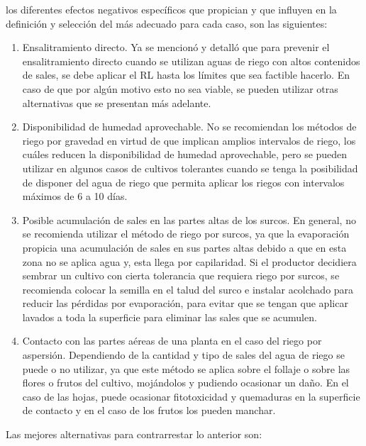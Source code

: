los diferentes efectos negativos específicos que propician y que influyen en la definición y selección del más adecuado para cada caso, son las siguientes:
\begin{enumerate}
    \item Ensalitramiento directo. Ya se mencionó y detalló que para prevenir el ensalitramiento directo cuando se utilizan aguas de riego con altos contenidos de sales, se debe aplicar el RL hasta los límites que sea factible hacerlo. En caso de que por algún motivo esto no sea viable, se pueden utilizar otras alternativas que se presentan más adelante.
    \item Disponibilidad de humedad aprovechable. No se recomiendan los métodos de riego por gravedad en virtud de que implican amplios intervalos de riego, los cuáles reducen la disponibilidad de humedad aprovechable, pero se pueden utilizar en algunos casos de cultivos tolerantes cuando se tenga la posibilidad de disponer del agua de riego que permita aplicar los riegos con intervalos máximos de 6 a 10 días.
    \item Posible acumulación de sales en las partes altas de los surcos. En general, no se recomienda utilizar el método de riego por surcos, ya que la evaporación propicia una acumulación de sales en sus partes altas debido a que en esta zona no se aplica agua y, esta llega por capilaridad. Si el productor decidiera sembrar un cultivo con cierta tolerancia que requiera riego por surcos, se recomienda colocar la semilla en el talud del surco e instalar acolchado para reducir las pérdidas por evaporación, para evitar que se tengan que aplicar lavados a toda la superficie para eliminar las sales que se acumulen.
    \item Contacto con las partes aéreas de una planta en el caso del riego por aspersión. Dependiendo de la cantidad y tipo de sales del agua de riego se puede o no utilizar, ya que este método se aplica sobre el follaje o sobre las flores o frutos del cultivo, mojándolos y pudiendo ocasionar un daño. En el caso de las hojas, puede ocasionar fitotoxicidad y quemaduras en la superficie de contacto y en el caso de los frutos los pueden manchar.
\end{enumerate}
Las mejores alternativas para contrarrestar lo anterior son:


